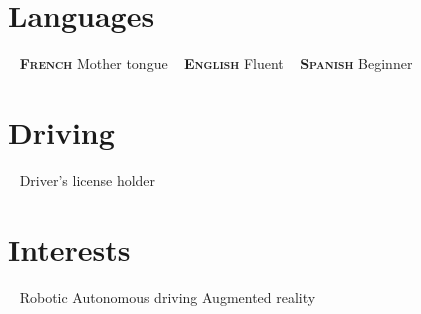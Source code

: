 \documentclass[]{friggeri-cv-cust}
\begin{document}
\begin{asidep2}
  \section{Languages}
    ~
    \textbf{\textsc{French}}
    Mother tongue
    ~
    \textbf{\textsc{English}}
    Fluent
    ~
    \textbf{\textsc{Spanish}}
    Beginner  
  \section{Driving}
    ~
    Driver's license holder
  \section{Interests}
  ~
  Robotic
  Autonomous driving    
  Augmented reality  
\end{asidep2}
\end{document}
